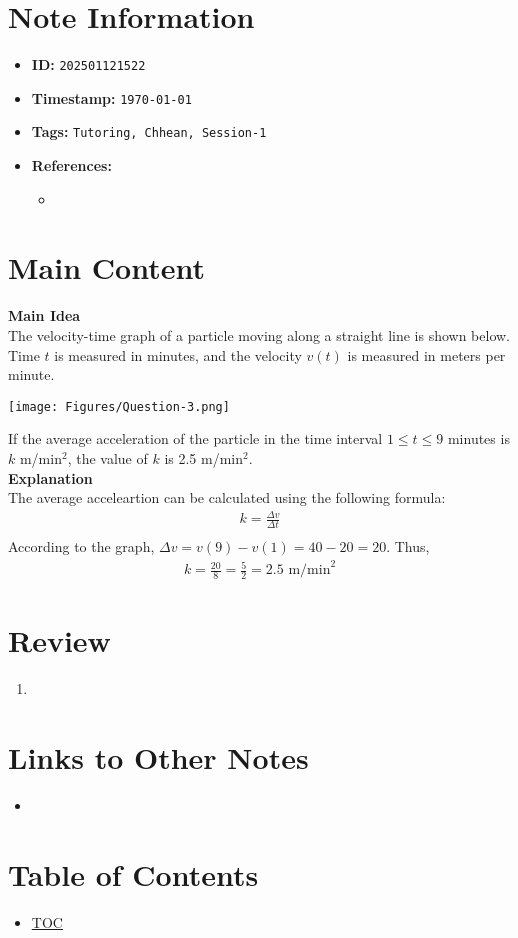 \clearpage
{}
\label{202501121522}
\renewcommand{\notetitle}{Question-3}

\section*{Note Information}
\begin{itemize}
  \item \textbf{ID:} \texttt{202501121522}
  \item \textbf{Timestamp:} \texttt{\today \ \currenttime}
  \item \textbf{Tags:} \texttt{Tutoring, Chhean, Session-1}
  \item \textbf{References:}
    \begin{itemize}
      \item \href{}{}
    \end{itemize}
\end{itemize}


\section*{Main Content}
\textbf{Main Idea}\\
The velocity-time graph of a particle moving along a straight line is shown below. Time $t$ is measured in minutes, and the velocity $v(t)$ is measured in meters per minute.
\begin{center}
  \texttt{[image: Figures/Question-3.png]}
\end{center}
If the average acceleration of the particle in the time interval $1 \leq t \leq 9$ minutes is $k$ m/min$^2$, the value of $k$ is 2.5 m/min$^2$.\\

\textbf{Explanation}\\
The average acceleartion can be calculated using the following formula:
\begin{align*}
  k = \frac{\Delta v}{\Delta t}\\ 
\end{align*}
According to the graph, $\Delta v = v(9) - v(1) = 40-20 = 20$. Thus,
\begin{align*}
  k = \frac{20}{8} = \frac{5}{2} = 2.5 \text{ m/min}^2
\end{align*}


\section*{Review}
\begin{enumerate}
  \item 
\end{enumerate}


\section*{Links to Other Notes}
\begin{itemize}
  \item \hyperref[]{}
\end{itemize}

\section*{Table of Contents}

\begin{itemize}
  \item \hyperref[toc]{TOC}
\end{itemize}

